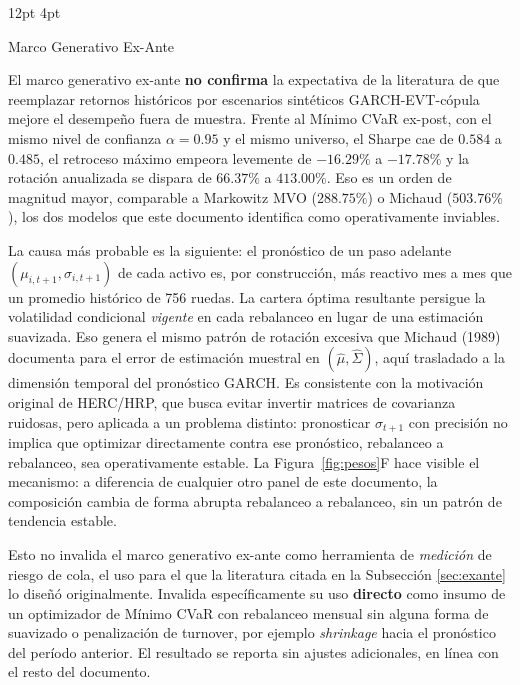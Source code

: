 \documentclass[11pt,a4paper]{article}
\makeatletter
\renewcommand\subsection{\@startsection{subsection}{2}{\z@}%
  {12pt \@plus 2pt \@minus 1pt}%
  {4pt}%
  {\raggedright\normalsize\bfseries\color{navyblue}}}
\makeatother
\begin{document}
\subsection{Marco Generativo Ex-Ante}

El marco generativo ex-ante \textbf{no confirma} la expectativa de la literatura de que reemplazar retornos históricos por escenarios sintéticos GARCH-EVT-cópula mejore el desempeño fuera de muestra. Frente al Mínimo CVaR ex-post, con el mismo nivel de confianza $\alpha=0.95$ y el mismo universo, el Sharpe cae de $0.584$ a $0.485$, el retroceso máximo empeora levemente de $-16.29\%$ a $-17.78\%$ y la rotación anualizada se dispara de $66.37\%$ a $413.00\%$. Eso es un orden de magnitud mayor, comparable a Markowitz MVO ($288.75\%$) o Michaud ($503.76\%$), los dos modelos que este documento identifica como operativamente inviables.

La causa más probable es la siguiente: el pronóstico de un paso adelante $(\mu_{i,t+1}, \sigma_{i,t+1})$ de cada activo es, por construcción, más reactivo mes a mes que un promedio histórico de 756 ruedas. La cartera óptima resultante persigue la volatilidad condicional \textit{vigente} en cada rebalanceo en lugar de una estimación suavizada. Eso genera el mismo patrón de rotación excesiva que Michaud (1989) documenta para el error de estimación muestral en $(\hat{\mu}, \hat{\Sigma})$, aquí trasladado a la dimensión temporal del pronóstico GARCH. Es consistente con la motivación original de HERC/HRP, que busca evitar invertir matrices de covarianza ruidosas, pero aplicada a un problema distinto: pronosticar $\sigma_{t+1}$ con precisión no implica que optimizar directamente contra ese pronóstico, rebalanceo a rebalanceo, sea operativamente estable. La Figura~\ref{fig:pesos}F hace visible el mecanismo: a diferencia de cualquier otro panel de este documento, la composición cambia de forma abrupta rebalanceo a rebalanceo, sin un patrón de tendencia estable.

Esto no invalida el marco generativo ex-ante como herramienta de \textit{medición} de riesgo de cola, el uso para el que la literatura citada en la Subsección \ref{sec:exante} lo diseñó originalmente. Invalida específicamente su uso \textbf{directo} como insumo de un optimizador de Mínimo CVaR con rebalanceo mensual sin alguna forma de suavizado o penalización de turnover, por ejemplo \textit{shrinkage} hacia el pronóstico del período anterior. El resultado se reporta sin ajustes adicionales, en línea con el resto del documento.
\end{document}
